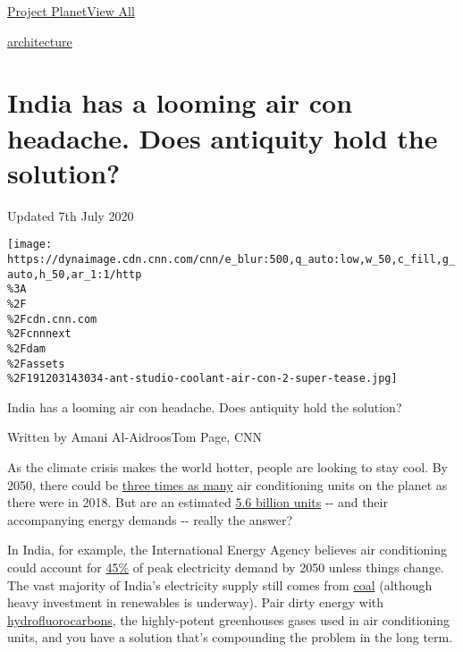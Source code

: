 \href{/}{}\href{/style}{}

\href{/specials/world/project-planet-climate-change-solutions}{Project
Planet}\href{/specials/world/project-planet-climate-change-solutions}{View
All}

\href{/style/architecture}{architecture}

\hypertarget{india-has-a-looming-air-con-headache-does-antiquity-hold-the-solution}{%
\section{India has a looming air con headache. Does antiquity hold the
solution?}\label{india-has-a-looming-air-con-headache-does-antiquity-hold-the-solution}}

Updated 7th July 2020

\texttt{[image: https://dynaimage.cdn.cnn.com/cnn/e\_blur:500,q\_auto:low,w\_50,c\_fill,g\_auto,h\_50,ar\_1:1/http\\\%3A\\\%2F\\\%2Fcdn.cnn.com\\\%2Fcnnnext\\\%2Fdam\\\%2Fassets\\\%2F191203143034-ant-studio-coolant-air-con-2-super-tease.jpg]}

India has a looming air con headache. Does antiquity hold the solution?

Written by Amani Al-AidroosTom Page, CNN

As the climate crisis makes the world hotter, people are looking to stay
cool. By 2050, there could be
\href{https://www.iea.org/newsroom/news/2018/may/air-conditioning-use-emerges-as-one-of-the-key-drivers-of-global-electricity-dema.html}{three
times as many} air conditioning units on the planet as there were in
2018. But are an estimated
\href{https://www.iea.org/newsroom/news/2018/may/air-conditioning-use-emerges-as-one-of-the-key-drivers-of-global-electricity-dema.html}{5.6
billion units} -\/- and their accompanying energy demands -\/- really
the answer?

In India, for example, the International Energy Agency believes air
conditioning could account for
\href{https://www.iea.org/newsroom/news/2018/may/air-conditioning-use-emerges-as-one-of-the-key-drivers-of-global-electricity-dema.html}{45\%}
of peak electricity demand by 2050 unless things change. The vast
majority of India's electricity supply still comes from
\href{https://cnn.com/2019/07/11/business/india-energy-coal/index.html}{coal}
(although heavy investment in renewables is underway). Pair dirty energy
with
\href{https://cnn.com/2019/09/04/politics/trump-climate-change-policy-rollbacks/index.html}{hydrofluorocarbons},
the highly-potent greenhouses gases used in air conditioning units, and
you have a solution that's compounding the problem in the long term.

